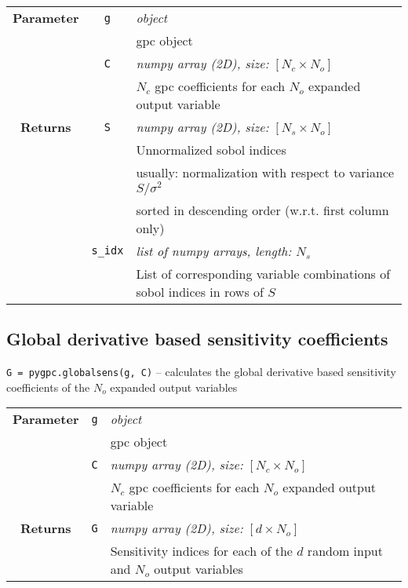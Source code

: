 \begin{tabular}{c c l}
	\hline
	\textbf{Parameter} & \texttt{g}      & \textit{object}                                                             \\
	                   &                 & gpc object                                                                  \\
	                   & \texttt{C}      & \textit{numpy array (2D), size:} $[N_c \times N_o]$                         \\
	                   &                 & $N_c$ gpc coefficients for each $N_o$ expanded output variable                     \\ \hline
	 \textbf{Returns}  & \texttt{S}      & \textit{numpy array (2D), size:} $[N_s \times N_o]$                          \\
	                   &                 & Unnormalized sobol indices                                                  \\
	                   &                 & usually: normalization with respect to variance $S/\sigma^2$                \\
	                   &                 & sorted in descending order (w.r.t. first column only)                       \\
	                   & \texttt{s\_idx} & \textit{list of numpy arrays, length: $N_s$}                                \\
	                   &                 & List of corresponding variable combinations of sobol indices in rows of $S$
\end{tabular} 


\subsection{Global derivative based sensitivity coefficients}
\texttt{G = pygpc.globalsens(g, C)} -- calculates the global derivative based sensitivity coefficients of the $N_o$ expanded output variables 
\renewcommand{\arraystretch}{1.3}

\begin{tabular}{c c l}
	\hline
	\textbf{Parameter} & \texttt{g} & \textit{object}                                                \\
	                   &            & gpc object                                                     \\
	                   & \texttt{C} & \textit{numpy array (2D), size:} $[N_c \times N_o]$            \\
	                   &            & $N_c$ gpc coefficients for each $N_o$ expanded output variable \\ \hline
	 \textbf{Returns}  & \texttt{G} & \textit{numpy array (2D), size:} $[d \times N_o]$              \\
	                   &            & Sensitivity indices for each of the $d$ random input and $N_o$ output variables
\end{tabular} 


